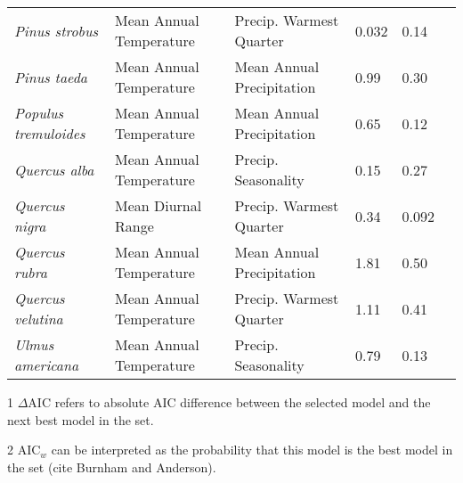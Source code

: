 \begin{table}[tb]
\begin{threeparttable}
\begin{tabular}{llllll}
{\it Pinus strobus}           & Mean Annual Temperature & Precip. Warmest Quarter   & 0.032                & 0.14             \\
{\it Pinus taeda}             & Mean Annual Temperature & Mean Annual Precipitation & 0.99                 & 0.30             \\
{\it Populus tremuloides}     & Mean Annual Temperature & Mean Annual Precipitation & 0.65                 & 0.12             \\ 
{\it Quercus alba}            & Mean Annual Temperature & Precip. Seasonality       & 0.15                 & 0.27             \\
{\it Quercus nigra}           & Mean Diurnal Range      & Precip. Warmest Quarter   & 0.34                 & 0.092            \\
{\it Quercus rubra}           & Mean Annual Temperature & Mean Annual Precipitation & 1.81                 & 0.50             \\
{\it Quercus velutina}        & Mean Annual Temperature & Precip. Warmest Quarter   & 1.11                 & 0.41             \\
{\it Ulmus americana}         & Mean Annual Temperature & Precip. Seasonality       & 0.79                 & 0.13             \\ 
\bottomrule
\end{tabular}
\begin{tablenotes}
\item [1] $\Delta$AIC refers to absolute AIC difference between the selected model and the next best model in the set.
\item [2] AIC$_w$ can be interpreted as the probability that this model is the best model in the set (cite Burnham and Anderson).
\end{tablenotes}
\end{threeparttable}
\end{table}


